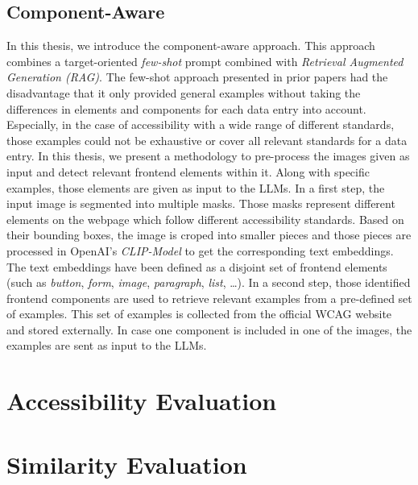 \subsection{Component-Aware}
In this thesis, we introduce the component-aware approach. This approach combines 
a target-oriented \textit{few-shot} prompt combined with 
\textit{Retrieval Augmented Generation (RAG)}.\newline
The few-shot approach presented in prior papers had the disadvantage that it only
provided general examples without taking the differences in elements and components 
for each data entry into account. Especially, in the case of accessibility with 
a wide range of different standards, those examples could not be exhaustive or cover 
all relevant standards for a data entry. In this thesis, we present a methodology to 
pre-process the images given as input and detect relevant frontend elements within it.
Along with specific examples, those elements are given as input to the LLMs.\newline
In a first step, the input image is segmented into multiple masks. Those masks 
represent different elements on the webpage which follow different accessibility 
standards. Based on their bounding boxes, the image is croped into smaller pieces 
and those pieces are processed in OpenAI's \textit{CLIP-Model} to get the 
corresponding text embeddings. The text embeddings have been defined as a disjoint 
set of frontend elements (such as 
\textit{button}, \textit{form}, \textit{image}, \textit{paragraph}, \textit{list}, 
\ldots). \newline
In a second step, those identified frontend components are used to retrieve
relevant examples from a pre-defined set of examples. This set of examples is
collected from the official WCAG website and stored externally. In case one 
component is included in one of the images, the examples are sent as input to
the LLMs. 

\section{Accessibility Evaluation}

\section{Similarity Evaluation}
